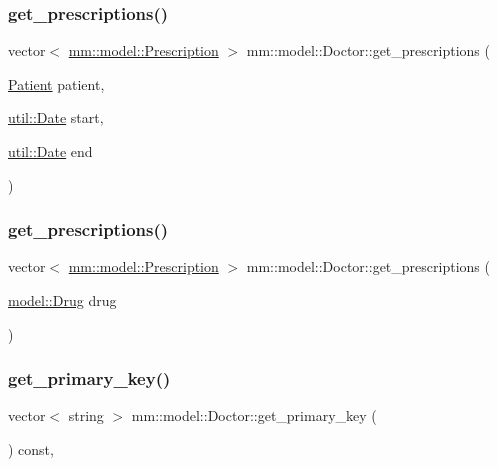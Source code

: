 \subsubsection{\texorpdfstring{get\+\_\+prescriptions()}{get\_prescriptions()}\hspace{0.1cm}{\footnotesize\ttfamily [1/2]}}
{\footnotesize\ttfamily vector$<$ \hyperlink{classmm_1_1model_1_1_prescription}{mm\+::model\+::\+Prescription} $>$ mm\+::model\+::\+Doctor\+::get\+\_\+prescriptions (\begin{DoxyParamCaption}\item[{\hyperlink{classmm_1_1model_1_1_patient}{Patient}}]{patient,  }\item[{\hyperlink{structmm_1_1util_1_1_date}{util\+::\+Date}}]{start,  }\item[{\hyperlink{structmm_1_1util_1_1_date}{util\+::\+Date}}]{end }\end{DoxyParamCaption})}

\mbox{\label{classmm_1_1model_1_1_doctor_a76bf6b545709c7a784e4320b11f587bf}} 
\subsubsection{\texorpdfstring{get\+\_\+prescriptions()}{get\_prescriptions()}\hspace{0.1cm}{\footnotesize\ttfamily [2/2]}}
{\footnotesize\ttfamily vector$<$ \hyperlink{classmm_1_1model_1_1_prescription}{mm\+::model\+::\+Prescription} $>$ mm\+::model\+::\+Doctor\+::get\+\_\+prescriptions (\begin{DoxyParamCaption}\item[{\hyperlink{classmm_1_1model_1_1_drug}{model\+::\+Drug}}]{drug }\end{DoxyParamCaption})}

\mbox{\label{classmm_1_1model_1_1_doctor_a935989cbe2274076c2b409126d4faccd}} 
\subsubsection{\texorpdfstring{get\+\_\+primary\+\_\+key()}{get\_primary\_key()}}
{\footnotesize\ttfamily vector$<$ string $>$ mm\+::model\+::\+Doctor\+::get\+\_\+primary\+\_\+key (\begin{DoxyParamCaption}{ }\end{DoxyParamCaption}) const\hspace{0.3cm}{\ttfamily [override]}, {\ttfamily [virtual]}}



